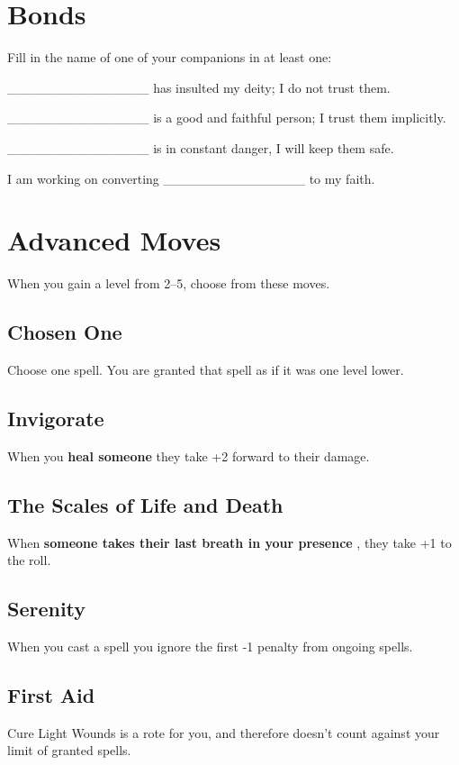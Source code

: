 \section{Bonds}


 Fill in the name of one of your companions in at least one:


 \_\_\_\_\_\_\_\_\_\_\_\_\_\_\_ has insulted my deity; I do not trust them.


 \_\_\_\_\_\_\_\_\_\_\_\_\_\_\_ is a good and faithful person; I trust them implicitly.


 \_\_\_\_\_\_\_\_\_\_\_\_\_\_\_ is in constant danger, I will keep them safe.


 I am working on converting \_\_\_\_\_\_\_\_\_\_\_\_\_\_\_ to my faith.
\section{Advanced Moves}


 {\Large When you gain a level from 2--5, choose from these moves.}
\subsection{Chosen One}


 Choose one spell. You are granted that spell as if it was one level lower.
\subsection{Invigorate}


 When you \textbf{heal someone}
 they take +2 forward to their damage.
\subsection{The Scales of Life and Death}


 When \textbf{someone takes their last breath in your presence}
, they take +1 to the roll.
\subsection{Serenity}


 When you cast a spell you ignore the first -1 penalty from ongoing spells.
\subsection{First Aid}


 Cure Light Wounds is a rote for you, and therefore doesn't count against your limit of granted spells.
